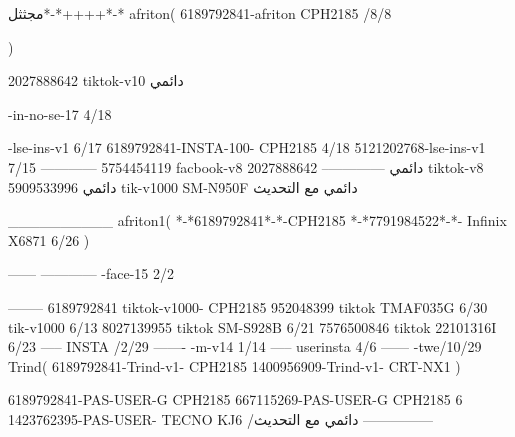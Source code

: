 مجثثل*-*++++*-*
afriton(
6189792841-afriton CPH2185  /8/8

)

2027888642 tiktok-v10
دائمي

-in-no-se-17 4/18

-lse-ins-v1 6/17
6189792841-INSTA-100- CPH2185 4/18
5121202768-lse-ins-v1 7/15
------------
5754454119 facbook-v8
دائمي
--------------
2027888642 tiktok-v8
دائمي
5909533996 tik-v1000  SM-N950F
دائمي مع التحديث

__________
afriton1(
*-*6189792841*-*-CPH2185
*-*7791984522*-*- Infinix X6871  6/26
)


------
------------
-face-15 2/2

--------
6189792841 tiktok-v1000- CPH2185 
952048399 tiktok TMAF035G  6/30
 tik-v1000   6/13
8027139955 tiktok SM-S928B  6/21
7576500846 tiktok 22101316I  6/23
-----
 INSTA /2/29
-------
-m-v14 1/14
-----
userinsta 4/6
------
-twe/10/29
Trind(
6189792841-Trind-v1- CPH2185 
1400956909-Trind-v1- CRT-NX1 \6
)


6189792841-PAS-USER-G CPH2185 
667115269-PAS-USER-G CPH2185 6
1423762395-PAS-USER- TECNO KJ6  /دائمي مع التحديث
    ---------------

